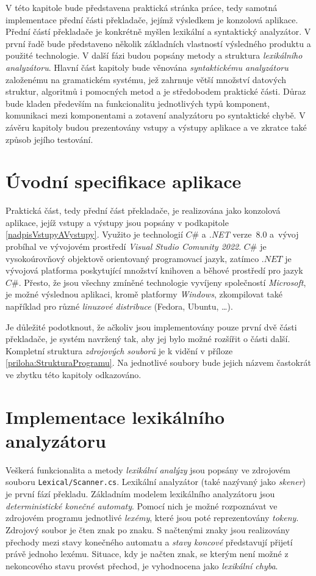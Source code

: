 V této kapitole bude představena praktická stránka práce, tedy samotná implementace přední části překladače, jejímž výsledkem je konzolová aplikace.
Přední částí překladače je konkrétně myšlen lexikální a syntaktický analyzátor. V první řadě bude představeno několik základních
vlastností výsledného produktu a použité technologie. V další fázi budou popsány metody a struktura \emph{lexikálního analyzátoru}. Hlavní část kapitoly bude věnována
\emph{syntaktickému analyzátoru} založenému na gramatickém systému, jež zahrnuje větší množství datových struktur, algoritmů i pomocných metod a je středobodem praktické části.
Důraz bude kladen především na funkcionalitu jednotlivých typů komponent, komunikaci mezi komponentami a zotavení analyzátoru po syntaktické chybě. V závěru kapitoly budou prezentovány
vstupy a výstupy aplikace a ve zkratce také způsob jejího testování.

\section{Úvodní specifikace aplikace}
Praktická část, tedy přední část překladače, je realizována jako konzolová aplikace, jejíž vstupy a výstupy jsou popsány v podkapitole \ref{nadpisVstupyAVystupy}. Využito
je technologií $C\#$ a \emph{.NET} verze~$8.0$ a~vývoj probíhal ve vývojovém prostředí \emph{Visual Studio Comunity 2022}. $C\#$ je vysokoúrovňový objektově orientovaný
programovací jazyk, zatímco $.NET$ je vývojová platforma poskytující množství knihoven a běhové prostředí pro jazyk $C\#$. Přesto, že jsou všechny zmíněné technologie vyvíjeny
společností \emph{Microsoft}, je možné výslednou aplikaci, kromě platformy \emph{Windows},
zkompilovat také například pro různé \emph{linuxové distribuce} (Fedora, Ubuntu, \dots).

Je důležité podotknout, že ačkoliv jsou implementovány pouze první dvě části překladače, je systém navržený tak, aby jej bylo možné rozšířit o části další.
Kompletní struktura \emph{zdrojových souborů} je k vidění v příloze \ref{priloha:StrukturaProgramu}. Na jednotlivé soubory bude jejich názvem
častokrát ve zbytku této kapitoly odkazováno.

\section{Implementace lexikálního analyzátoru}
Veškerá funkcionalita a metody \emph{lexikální analýzy} jsou popsány ve zdrojovém souboru \linebreak \verb|Lexical/Scanner.cs|.
Lexikální analyzátor (také nazývaný jako \emph{skener}) je první fází překladu. Základním modelem lexikálního analyzátoru jsou
\emph{deterministické konečné automaty}. Pomocí nich je možné rozpoznávat ve zdrojovém programu jednotlivé \emph{lexémy}, které jsou poté reprezentovány \emph{tokeny}.
Zdrojový soubor je čten znak po znaku. S načtenými znaky jsou realizovány přechody mezi stavy konečného automatu a \emph{stavy koncové} představují přijetí právě jednoho lexému.
Situace, kdy je načten znak, se kterým není možné z nekoncového stavu provést přechod, je vyhodnocena jako \emph{lexikální chyba}.

